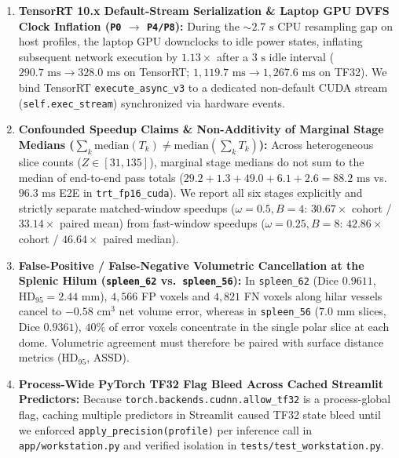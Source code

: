 \documentclass[10pt,twocolumn]{article}
\begin{document}
\begin{enumerate}[label=\textbf{Problem \Alph*:},wide=0pt]
    \item \textbf{TensorRT 10.x Default-Stream Serialization \& Laptop GPU DVFS Clock Inflation (\texttt{P0} $\to$ \texttt{P4/P8}):} During the $\sim 2.7\text{ s}$ CPU resampling gap on host profiles, the laptop GPU downclocks to idle power states, inflating subsequent network execution by $\mathbf{1.13\times}$ after a $3\text{ s}$ idle interval ($290.7\text{ ms} \to 328.0\text{ ms}$ on TensorRT; $1,119.7\text{ ms} \to 1,267.6\text{ ms}$ on TF32). We bind TensorRT \texttt{execute\_async\_v3} to a dedicated non-default CUDA stream (\texttt{self.exec\_stream}) synchronized via hardware events.
    \item \textbf{Confounded Speedup Claims \& Non-Additivity of Marginal Stage Medians ($\sum_k \text{median}(T_k) \neq \text{median}(\sum_k T_k)$):} Across heterogeneous slice counts ($Z \in [31, 135]$), marginal stage medians do not sum to the median of end-to-end pass totals ($29.2 + 1.3 + 49.0 + 6.1 + 2.6 = 88.2\text{ ms}$ vs.\ $96.3\text{ ms}$ E2E in \texttt{trt\_fp16\_cuda}). We report all six stages explicitly and strictly separate matched-window speedups ($\omega=0.5, B=4$: $30.67\times$ cohort / $33.14\times$ paired mean) from fast-window speedups ($\omega=0.25, B=8$: $42.86\times$ cohort / $46.64\times$ paired median).
    \item \textbf{False-Positive / False-Negative Volumetric Cancellation at the Splenic Hilum (\texttt{spleen\_62} vs.\ \texttt{spleen\_56}):} In \texttt{spleen\_62} (Dice $0.9611$, $\text{HD}_{95} = 2.44\text{ mm}$), $4,566$ FP voxels and $4,821$ FN voxels along hilar vessels cancel to $-0.58\text{ cm}^3$ net volume error, whereas in \texttt{spleen\_56} ($7.0\text{ mm}$ slices, Dice $0.9361$), $40\%$ of error voxels concentrate in the single polar slice at each dome. Volumetric agreement must therefore be paired with surface distance metrics ($\text{HD}_{95}$, $\text{ASSD}$).
    \item \textbf{Process-Wide PyTorch TF32 Flag Bleed Across Cached Streamlit Predictors:} Because \texttt{torch.backends.cudnn.allow\_tf32} is a process-global flag, caching multiple predictors in Streamlit caused TF32 state bleed until we enforced \texttt{apply\_precision(profile)} per inference call in \texttt{app/workstation.py} and verified isolation in \texttt{tests/test\_workstation.py}.
\end{enumerate}
\end{document}
